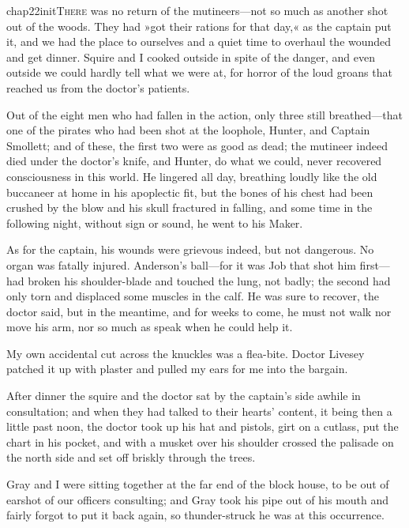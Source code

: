 
\lettrine[lines=5,image=true,findent=2pt]{chap22initT}{here} was no return of the mutineers—not so much as another shot out of the woods. They had »got their rations for that day,« as the captain put it, and we had the place to ourselves and a quiet time to overhaul the wounded and get dinner. Squire and I cooked outside in spite of the danger, and even outside we could hardly tell what we were at, for horror of the loud groans that reached us from the doctor's patients.

Out of the eight men who had fallen in the action, only three still breathed—that one of the pirates who had been shot at the loophole, Hunter, and Captain Smollett; and of these, the first two were as good as dead; the mutineer indeed died under the doctor's knife, and Hunter, do what we could, never recovered consciousness in this world. He lingered all day, breathing loudly like the old buccaneer at home in his apoplectic fit, but the bones of his chest had been crushed by the blow and his skull fractured in falling, and some time in the following night, without sign or sound, he went to his Maker.

As for the captain, his wounds were grievous indeed, but not dangerous. No organ was fatally injured. Anderson's ball—for it was Job that shot him first—had broken his shoulder-blade and touched the lung, not badly; the second had only torn and displaced some muscles in the calf. He was sure to recover, the doctor said, but in the meantime, and for weeks to come, he must not walk nor move his arm, nor so much as speak when he could help it.

My own accidental cut across the knuckles was a flea-bite. Doctor Livesey patched it up with plaster and pulled my ears for me into the bargain.

After dinner the squire and the doctor sat by the captain's side awhile in consultation; and when they had talked to their hearts' content, it being then a little past noon, the doctor took up his hat and pistols, girt on a cutlass, put the chart in his pocket, and with a musket over his shoulder crossed the palisade on the north side and set off briskly through the trees.

Gray and I were sitting together at the far end of the block house, to be out of earshot of our officers consulting; and Gray took his pipe out of his mouth and fairly forgot to put it back again, so thunder-struck he was at this occurrence.

